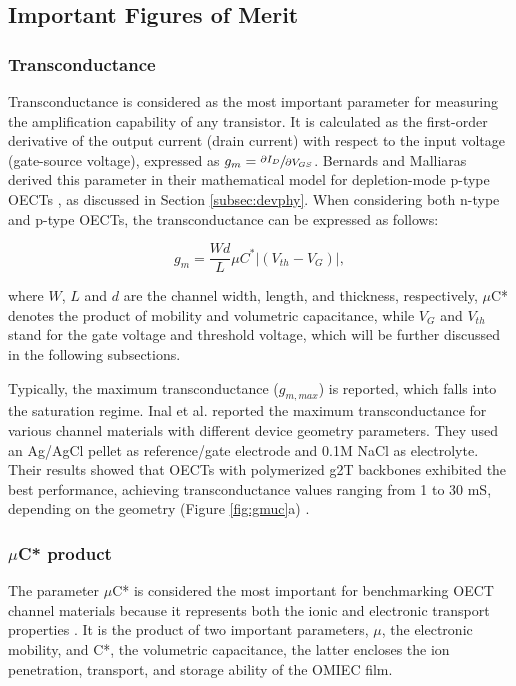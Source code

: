 \subsection{Important Figures of Merit} \label{OECT:fom}

\subsubsection{Transconductance}
Transconductance is considered as the most important parameter for measuring the amplification capability of any transistor. It is calculated as the first-order derivative of the output current (drain current) with respect to the input voltage (gate-source voltage), expressed as $g_{m} = \sfrac{\partial I_{D}}{\partial V_{GS}}$. Bernards and Malliaras derived this parameter in their mathematical model for depletion-mode p-type OECTs \cite{bernardsSteadyStateTransientBehavior2007}, as discussed in Section \ref{subsec:devphy}. When considering both n-type and p-type OECTs, the transconductance can be expressed as follows: %

\begin{equation}\label{eq:gm}
	g_{m} = \frac{Wd}{L} \mu C^{*} |(V_{th} - V_{G})|,
\end{equation}

where $W$, $L$ and $d$ are the channel width, length, and thickness, respectively, $\mu$C* denotes the product of mobility and volumetric capacitance, while $V_{G}$ and $V_{th}$ stand for the gate voltage and threshold voltage, which will be further discussed in the following subsections.

Typically, the maximum transconductance ($g_{m,max}$) is reported, which falls into the saturation regime. Inal et al. reported the maximum transconductance for various channel materials with different device geometry parameters. They used an Ag/AgCl pellet as reference/gate electrode and 0.1M NaCl as electrolyte. Their results showed that OECTs with polymerized g2T backbones exhibited the best performance, achieving transconductance values ranging from 1 to 30 mS, depending on the geometry (Figure \ref{fig:gmuc}a) \cite{inalBenchmarkingOrganicMixed2017}.

\subsubsection{$\mu$C* product}

The parameter $\mu$C* is considered the most important for benchmarking OECT channel materials because it represents both the ionic and electronic transport properties %
\cite{inalBenchmarkingOrganicMixed2017}. %
It is the product of two important parameters, $\mu$, the electronic mobility, and C*, the volumetric capacitance, the latter encloses the ion penetration, transport, and storage ability of the OMIEC film.

